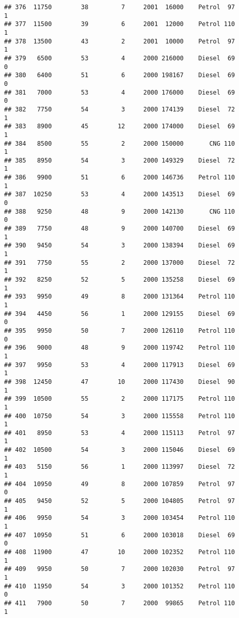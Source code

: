 \documentclass[]{article}
\begin{document}
\begin{verbatim}
## 376  11750        38         7     2001  16000    Petrol  97         1
## 377  11500        39         6     2001  12000    Petrol 110         1
## 378  13500        43         2     2001  10000    Petrol  97         1
## 379   6500        53         4     2000 216000    Diesel  69         0
## 380   6400        51         6     2000 198167    Diesel  69         0
## 381   7000        53         4     2000 176000    Diesel  69         0
## 382   7750        54         3     2000 174139    Diesel  72         1
## 383   8900        45        12     2000 174000    Diesel  69         1
## 384   8500        55         2     2000 150000       CNG 110         1
## 385   8950        54         3     2000 149329    Diesel  72         1
## 386   9900        51         6     2000 146736    Petrol 110         1
## 387  10250        53         4     2000 143513    Diesel  69         0
## 388   9250        48         9     2000 142130       CNG 110         0
## 389   7750        48         9     2000 140700    Diesel  69         1
## 390   9450        54         3     2000 138394    Diesel  69         1
## 391   7750        55         2     2000 137000    Diesel  72         1
## 392   8250        52         5     2000 135258    Diesel  69         1
## 393   9950        49         8     2000 131364    Petrol 110         1
## 394   4450        56         1     2000 129155    Diesel  69         0
## 395   9950        50         7     2000 126110    Petrol 110         0
## 396   9000        48         9     2000 119742    Petrol 110         1
## 397   9950        53         4     2000 117913    Diesel  69         1
## 398  12450        47        10     2000 117430    Diesel  90         1
## 399  10500        55         2     2000 117175    Petrol 110         1
## 400  10750        54         3     2000 115558    Petrol 110         1
## 401   8950        53         4     2000 115113    Petrol  97         1
## 402  10500        54         3     2000 115046    Diesel  69         1
## 403   5150        56         1     2000 113997    Diesel  72         1
## 404  10950        49         8     2000 107859    Petrol  97         0
## 405   9450        52         5     2000 104805    Petrol  97         1
## 406   9950        54         3     2000 103454    Petrol 110         1
## 407  10950        51         6     2000 103018    Diesel  69         0
## 408  11900        47        10     2000 102352    Petrol 110         1
## 409   9950        50         7     2000 102030    Petrol  97         1
## 410  11950        54         3     2000 101352    Petrol 110         0
## 411   7900        50         7     2000  99865    Petrol 110         1

\end{verbatim}
\end{document}
